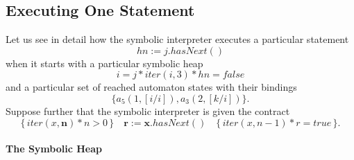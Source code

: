 \documentclass[a4paper]{article}
\theoremstyle{remark}
\begin{document}
\subsection{Executing One Statement}\label{sec:execute} %

Let us see in detail how the symbolic interpreter executes a particular statement
\begin{equation}\label{eq:execute.statement}
\mathit{hn}:=j.\mathit{hasNext}()
\end{equation}
when it starts with a particular symbolic heap
\begin{equation}\label{eq:execute.heap}
i=j * \mathit{iter}(i,3) * \mathit{hn} = \mathit{false}
\end{equation}
and a particular set of reached automaton states with their bindings
\begin{equation}\label{eq:execute.props}
\{a_5(1,[i/i]), a_3(2,[k/i])\}.
\end{equation}
Suppose further that the symbolic interpreter is given the contract
\begin{equation}\label{eq:execute.spec}
\{\,\mathit{iter}(x, \mathbf{n})*n>0\,\}
  \quad \mathbf{r} := \mathbf{x}.\mathit{hasNext}()
  \quad \{\,\mathit{iter}(x, n-1)*r=\mathit{true}\,\}.
\end{equation}

\paragraph{The Symbolic Heap} %
\end{document}
